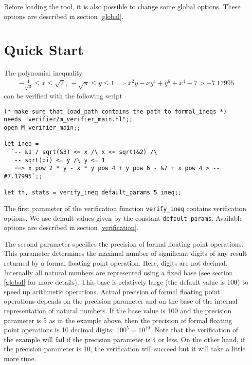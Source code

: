 \documentclass[a4paper]{article}
\begin{document}
Before loading the tool, it is also possible to change some global options. These options are described in section \ref{global}.


\section{Quick Start}

The polynomial inequality
\begin{multline*}
-\frac{1}{\sqrt{3}} \le x \le \sqrt{2},\ -\sqrt{\pi} \le y \le 1
\implies x^2 y - x y^4 + y^6 + x^4 - 7 > -7.17995
\end{multline*}
can be verified with the following script

\begin{verbatim}
(* make sure that load_path contains the path to formal_ineqs *)
needs "verifier/m_verifier_main.hl";;
open M_verifier_main;;

let ineq =
  `-- &1 / sqrt(&3) <= x /\ x <= sqrt(&2) /\
   -- sqrt(pi) <= y /\ y <= 1
   ==> x pow 2 * y - x * y pow 4 + y pow 6 - &7 + x pow 4 > -- #7.17995`;;

let th, stats = verify_ineq default_params 5 ineq;;
\end{verbatim}

The first parameter of the verification function \verb|verify_ineq| contains verification options. We use default values given by the constant \verb|default_params|. Available options are described in section \ref{verification}.

The second parameter specifies the precision of formal floating point operations. This parameter determines the maximal number of significant digits of any result returned by a formal floating point operation. Here, digits are not decimal. Internally all natural numbers are represented using a fixed base (see section \ref{global} for more details). This base is relatively large (the default value is 100) to speed up arithmetic operations. Actual precision of formal floating point operations depends on the precision parameter and on the base of the internal representation of natural numbers. If the base value is 100 and the precision parameter is 5 as in the example above, then the precision of formal floating point operations is 10 decimal digits: $100^5 = 10^{10}$. Note that the verification of the example will fail if the precision parameter is 4 or less. On the other hand, if the precision parameter is 10, the verification will succeed but it will take a little more time.
\end{document}
